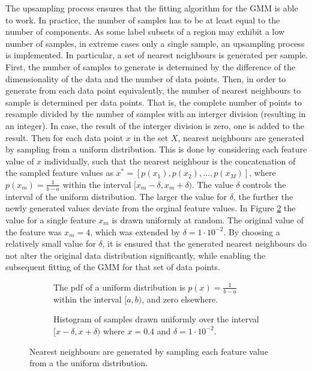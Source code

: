  The upsampling process ensures that the fitting algorithm for the GMM is able to work. In practice, the number of samples has to be at least equal to the number of components. As some label subsets of a region may exhibit a low number of samples, in extreme cases only a single sample, an upsampling process is implemented. In particular, a set of nearest neighbours is generated per sample. First, the number of samples to generate is determined by the difference of the dimensionality of the data and the number of data points. Then, in order to generate from each data point equivalently, the number of nearest neighbours to sample is determined per data points. That is, the complete number of points to resample divided by the number of samples with an interger division (resulting in an integer). In case, the result of the interger division is zero, one is added to the result. Then for each data point $x$ in the set $X$, nearest neighbours are generated by sampling from a uniform distribution. This is done by considering each feature value of $x$ individually, such that the nearest neighbour is the concatenation of the sampled feature values as $x^* = [p(x_1), p(x_2), \dots, p(x_M)]$, where $p(x_m)=\frac{1}{b-a}$ within the interval $[x_m-\delta, x_m+\delta)$. The value $\delta$ controls the interval of the uniform distribution. The larger the value for $\delta$, the further the newly generated values deviate from the orginal feature values. In Figure \ref{subfig:hist_nn} the value for a single feature $x_m$ is drawn uniformly at random. The original value of the feature was $x_m=4$, which was extended by $\delta=1\cdot10^{-2}$. By choosing a relatively small value for $\delta$, it is ensured that the generated nearest neighbours do not alter the original data distribution significantly, while enabling the subsequent fitting of the GMM for that set of data points.


 \begin{figure}%
    \centering%
    \begin{subfigure}[b]{0.49\textwidth}%
        \centering\captionsetup{width=.8\linewidth}%
        \caption{The pdf of a uniform distribution is $p(x) = \frac{1}{b-a}$ within the interval $[a, b)$, and zero elsewhere.}%
        \label{subfig:uniform_dist}%
    \end{subfigure}%
    \hfill%
    \begin{subfigure}[b]{0.49\textwidth}%
        \centering\captionsetup{width=.8\linewidth}%
        \caption{Histogram of  samples drawn uniformly over the interval $[x-\delta, x+\delta)$ where $x=0.4$ and $\delta=1 \cdot 10^{-2}$.}%
        \label{subfig:hist_nn}%
    \end{subfigure}%
    \caption{Nearest neighbours are generated by sampling each feature value from a the uniform distribution.}%
    \label{fig:uniform_dist_nn}%
\end{figure}%

